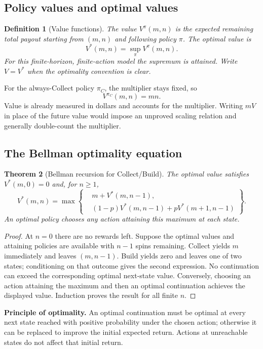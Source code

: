 \documentclass[11pt]{article}
\newtheorem{definition}{Definition}[section]
\newtheorem{theorem}[definition]{Theorem}
\theoremstyle{remark}\newtheorem{remark}[definition]{Remark}
\begin{document}
\subsection{Policy values and optimal values}
\begin{definition}[Value functions]
The value $V^\pi(m,n)$ is the expected remaining total payout starting from $(m,n)$ and following policy $\pi$. The optimal value is
\[
V^*(m,n)=\sup_\pi V^\pi(m,n).
\]
For this finite-horizon, finite-action model the supremum is attained. Write $V=V^*$ when the optimality convention is clear.
\end{definition}
For the always-Collect policy $\pi_C$, the multiplier stays fixed, so
\[
V^{\pi_C}(m,n)=mn.
\]
Value is already measured in dollars and accounts for the multiplier. Writing $mV$ in place of the future value would impose an unproved scaling relation and generally double-count the multiplier.

\newpage
\subsection{The Bellman optimality equation}
\begin{theorem}[Bellman recursion for Collect/Build]
The optimal value satisfies $V^*(m,0)=0$ and, for $n\geq1$,
\begin{equation}
\boxed{V^*(m,n)=\max\left\{
\begin{aligned}
&m+V^*(m,n-1),\\
&(1-p)V^*(m,n-1)+pV^*(m+1,n-1)
\end{aligned}\right\}.}
\end{equation}
An optimal policy chooses any action attaining this maximum at each state.
\end{theorem}
\begin{proof}
At $n=0$ there are no rewards left. Suppose the optimal values and attaining policies are available with $n-1$ spins remaining. Collect yields $m$ immediately and leaves $(m,n-1)$. Build yields zero and leaves one of two states; conditioning on that outcome gives the second expression. No continuation can exceed the corresponding optimal next-state value. Conversely, choosing an action attaining the maximum and then an optimal continuation achieves the displayed value. Induction proves the result for all finite $n$.
\end{proof}
\textbf{Principle of optimality.} An optimal continuation must be optimal at every next state reached with positive probability under the chosen action; otherwise it can be replaced to improve the initial expected return. Actions at unreachable states do not affect that initial return.
\end{document}
